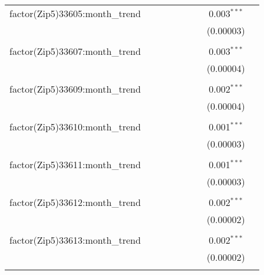 \begin{table}[H]
{\begin{tabular}{@{\extracolsep{5pt}}lcccccccc}
  factor(Zip5)33605:month\_trend &  &  &  &  &  &  & 0.003$^{***}$ &  \\  

   &  &  &  &  &  &  & (0.00003) &  \\  

   & & & & & & & & \\  

  factor(Zip5)33607:month\_trend &  &  &  &  &  &  & 0.003$^{***}$ &  \\  

   &  &  &  &  &  &  & (0.00004) &  \\  

   & & & & & & & & \\  

  factor(Zip5)33609:month\_trend &  &  &  &  &  &  & 0.002$^{***}$ &  \\  

   &  &  &  &  &  &  & (0.00004) &  \\  

   & & & & & & & & \\  

  factor(Zip5)33610:month\_trend &  &  &  &  &  &  & 0.001$^{***}$ &  \\  

   &  &  &  &  &  &  & (0.00003) &  \\  

   & & & & & & & & \\  

  factor(Zip5)33611:month\_trend &  &  &  &  &  &  & 0.001$^{***}$ &  \\  

   &  &  &  &  &  &  & (0.00003) &  \\  

   & & & & & & & & \\  

  factor(Zip5)33612:month\_trend &  &  &  &  &  &  & 0.002$^{***}$ &  \\  

   &  &  &  &  &  &  & (0.00002) &  \\  

   & & & & & & & & \\  

  factor(Zip5)33613:month\_trend &  &  &  &  &  &  & 0.002$^{***}$ &  \\  

   &  &  &  &  &  &  & (0.00002) &  \\  

   & & & & & & & & \\  


\end{tabular}}
\end{table}
